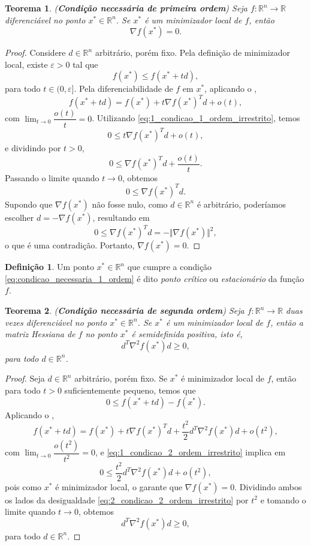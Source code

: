\documentclass[12pt,a4paper]{scrartcl}
\def\RR{\mathds{R}}
\newtheorem{teo}{Teorema}
\theoremstyle{definition}%
\newtheorem{defi}{Definição}
\begin{document}
\begin{teo}(\textbf{Condição necessária de primeira ordem}) \label{teo:condicao_necessaria_1_ordem}
Seja $f:\RR^{n} \rightarrow \RR$ diferenciável no ponto $x^{*} \in \RR^{n}$. Se $x^{*}$ é um minimizador local de $f$, então
\[ \label{eq:condicao_necessaria_1_ordem}
\nabla f(x^{*}) = 0.
\]
\end{teo}
\begin{proof}
Considere $d \in \RR^{n}$ arbitrário, porém fixo. Pela definição de minimizador local, existe $\varepsilon > 0$ tal que 
\[ \label{eq:1_condicao_1_ordem_irrestrito}
f(x^{*}) \leq f(x^{*}+td),
\]
para todo $t\in (0,\varepsilon ]$. Pela diferenciabilidade de $f$ em $x^{*}$, aplicando o , 
\[
f(x^{*}+td) = f(x^{*}) + t\nabla f(x^{*})^{T}d + o(t),
\] 
com $\lim_{t\rightarrow 0} \dfrac{o(t)}{t} =0$. Utilizando \eqref{eq:1_condicao_1_ordem_irrestrito}, temos
\[
0 \leq t\nabla f(x^{*})^{T}d + o(t),
\]
e dividindo por $t>0$, 
\[
0 \leq \nabla f(x^{*})^{T}d + \dfrac{o(t)}{t} .
\]
Passando o limite quando $t\rightarrow 0$, obtemos
\[
0 \leq \nabla f(x^{*})^{T}d .
\]
Supondo que $\nabla f(x^{*})$ não fosse nulo, como $d \in \RR^{n}$ é arbitrário, poderíamos escolher $d=-\nabla f(x^{*})$, resultando em
\[
0 \leq \nabla f(x^{*})^{T}d = - \Vert \nabla f(x^{*}) \Vert^{2} ,
\]
o que é uma contradição. Portanto, $\nabla f(x^{*}) =0$.
\end{proof}


\begin{defi}\label{defi:ponto_critico}
Um ponto $x^{*} \in \RR^{n}$ que cumpre a condição \eqref{eq:condicao_necessaria_1_ordem} é dito \emph{ponto crítico} ou \emph{estacionário} da função $f$. 
\end{defi}

\begin{teo}(\textbf{Condição necessária de segunda ordem}) \label{teo:condicao_necessaria_2_ordem}
Seja $f:\RR^{n} \rightarrow \RR$ duas vezes diferenciável no ponto $x^{*} \in \RR^{n}$. Se $x^{*}$ é um minimizador local de $f$, então a matriz Hessiana de $f$ no ponto $x^{*}$ é semidefinida positiva, isto é,
\[
d^{T} \nabla^{2} f(x^{*})d \geq 0,
\]
para todo $d \in \RR^{n}$.
\end{teo}
\begin{proof}
Seja $d\in \RR^{n}$ arbitrário, porém fixo. Se $x^{*}$ é minimizador local de $f$, então para todo $t>0$ suficientemente pequeno, temos que
\[\label{eq:1_condicao_2_ordem_irrestrito}
0 \leq f(x^{*}+td) - f(x^{*}).
\]
Aplicando o ,
\[
f(x^{*}+td) = f(x^{*}) + t\nabla f(x^{*})^{T}d + \dfrac{t^{2}}{2} d^{T}\nabla^{2} f(x^{*})d + o(t^{2}),
\]
com $\lim_{t\rightarrow 0} \dfrac{o(t^{2})}{t^{2}} =0$, e  \eqref{eq:1_condicao_2_ordem_irrestrito} implica em
\[ \label{eq:2_condicao_2_ordem_irrestrito}
0 \leq \dfrac{t^{2}}{2} d^{T}\nabla^{2} f(x^{*})d + o(t^{2}),
\]
 pois como $x^{*}$ é minimizador local, o  garante que $\nabla f(x^{*}) =0$. Dividindo ambos os lados da desigualdade \eqref{eq:2_condicao_2_ordem_irrestrito} por $t^{2}$ e tomando o limite quando $t\rightarrow 0$, obtemos
\[
d^{T} \nabla^{2} f(x^{*})d \geq 0,
\]
para todo $d \in \RR^{n}$.
\end{proof}
\end{document}
